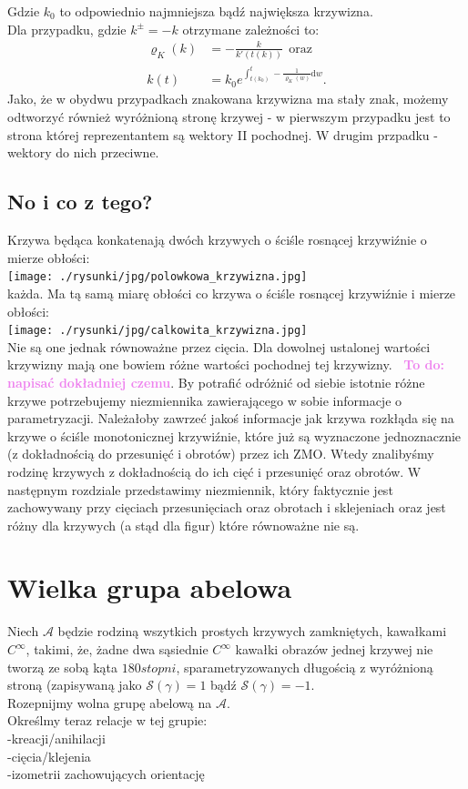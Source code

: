 \documentclass[a4paper, 12pt]{article}
\newcommand{\smalltodoII}[1]{\hfill \break \textbf{\ \textcolor{violet}{To do: #1}}\hfill \break}
\newcommand{\rysunek}[1]{\hfill \break\\[16pt] \Huge \textbf{\textcolor{violet}{Brakujący rysunek \normalsize
#1}} \hfill
\break \\[16pt] \normalsize}
\begin{document}
Gdzie $k_0$ to odpowiednio najmniejsza bądź największa krzywizna. \\
Dla przypadku, gdzie $k^\pm = -k$ otrzymane zależności to:
\begin{align}
    \varrho_K(k) &= -\frac{k}{k'(t(k))}\ \
    \textrm{oraz} \\
    k(t) &= k_0e^{\int_{t(k_0)}^{t}-\frac{1}{\varrho_K(w)}\text{d}w}.
\end{align}
Jako, że w obydwu przypadkach znakowana krzywizna ma stały znak, możemy odtworzyć również wyróżnioną stronę
krzywej - w pierwszym przypadku jest to strona której reprezentantem są wektory II pochodnej. W drugim
przpadku - wektory do nich przeciwne. \\

\subsection{No i co z tego?}
Krzywa będąca konkatenają dwóch krzywych o ściśle rosnącej krzywiźnie o mierze obłości: \\
\texttt{[image: ./rysunki/jpg/polowkowa\_krzywizna.jpg]} \\
każda. Ma tą samą miarę obłości co krzywa o ściśle rosnącej krzywiźnie i mierze obłości: \\
\texttt{[image: ./rysunki/jpg/calkowita\_krzywizna.jpg]} \\
Nie są one jednak równoważne przez cięcia. Dla dowolnej ustalonej wartości krzywizny mają one bowiem różne
wartości pochodnej tej krzywizny. \smalltodoII{napisać dokładniej czemu}.
By potrafić odróżnić od siebie istotnie różne krzywe potrzebujemy niezmiennika zawierającego w sobie
informacje o parametryzacji. Należałoby zawrzeć jakoś informacje jak krzywa rozkłąda się na krzywe o ściśle
monotonicznej krzywiźnie, które już są wyznaczone jednoznacznie (z dokładnością do przesunięć i
obrotów) przez ich ZMO.
Wtedy znalibyśmy rodzinę krzywych z dokładnością do ich cięć i przesunięć oraz obrotów.
W następnym rozdziale przedstawimy niezmiennik, który faktycznie jest zachowywany przy cięciach
przesunięciach oraz obrotach i
 sklejeniach oraz jest różny dla krzywych (a stąd dla figur) które równoważne nie są.

\section{Wielka grupa abelowa}
Niech $\mathcal{A}$ będzie rodziną wszytkich
prostych krzywych
zamkniętych, kawałkami $C^\infty$, takimi, że, żadne dwa sąsiednie $C^\infty$ kawałki obrazów jednej krzywej
nie tworzą ze sobą kąta $180 stopni$, sparametryzowanych długością z wyróżnioną stroną
(zapisywaną jako $\mathcal{S}(\gamma) = 1$ bądź $\mathcal{S}(\gamma)=-1$. \\
Rozepnijmy wolna grupę abelową na $\mathcal{A}$. \\
Określmy teraz relacje w tej grupie: \\
-kreacji/anihilacji \\
-cięcia/klejenia \\
-izometrii zachowujących orientację \\
\end{document}
